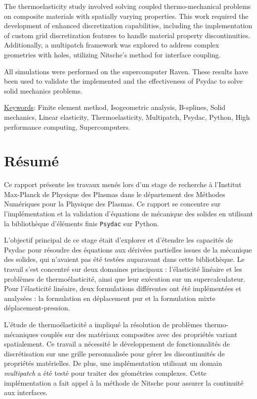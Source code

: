 \documentclass[a4paper,12pt,twoside]{report}
\begin{document}
The thermoelasticity study involved solving coupled thermo-mechanical problems on composite materials with spatially varying properties. This work required the development of enhanced discretization capabilities, including the implementation of custom grid discretization features to handle material property discontinuities. Additionally, a multipatch framework was explored to address complex geometries with holes, utilizing Nitsche's method for interface coupling.

All simulations were performed on the supercomputer Raven. These results have been used to validate the implemented and the effectiveness of Psydac to solve solid mechanics problems.

\vspace{0.4cm}

\underline{Keywords}: Finite element method, Isogeometric analysis, B-splines, Solid mechanics, Linear elasticity, Thermoelasticity, Multipatch, Psydac, Python, High performance computing, Supercomputers.

\section*{Résumé}

Ce rapport présente les travaux menés lors d'un stage de recherche à l'Institut Max-Planck de Physique des Plasmas dans le département des Méthodes Numériques pour la Physique des Plasmas. Ce rapport se concentre sur l'implémentation et la validation d'équations de mécanique des solides en utilisant la bibliothèque d'éléments finis \texttt{Psydac} sur Python.

L'objectif principal de ce stage était d'explorer et d'étendre les capacités de Psydac pour résoudre des équations aux dérivées partielles issues de la mécanique des solides, qui n'avaient pas été testées auparavant dans cette bibliothèque. Le travail s'est concentré sur deux domaines principaux : l'élasticité linéaire et les problèmes de thermoélasticité, ainsi que leur exécution sur un supercalculateur. Pour l'élasticité linéaire, deux formulations différentes ont été implémentées et analysées : la formulation en déplacement pur et la formulation mixte déplacement-pression.

L'étude de thermoélasticité a impliqué la résolution de problèmes thermo-mécaniques couplés sur des matériaux composites avec des propriétés variant spatialement. Ce travail a nécessité le développement de fonctionnalités de discrétisation sur une grille personnalisée pour gérer les discontinuités de propriétés matérielles. De plus, une implémentation utilisant un domain \textit{multipatch} a été testé pour traiter des géométries complexes. Cette implémentation a fait appel à la méthode de Nitsche pour assurer la continuité aux interfaces.
\end{document}
